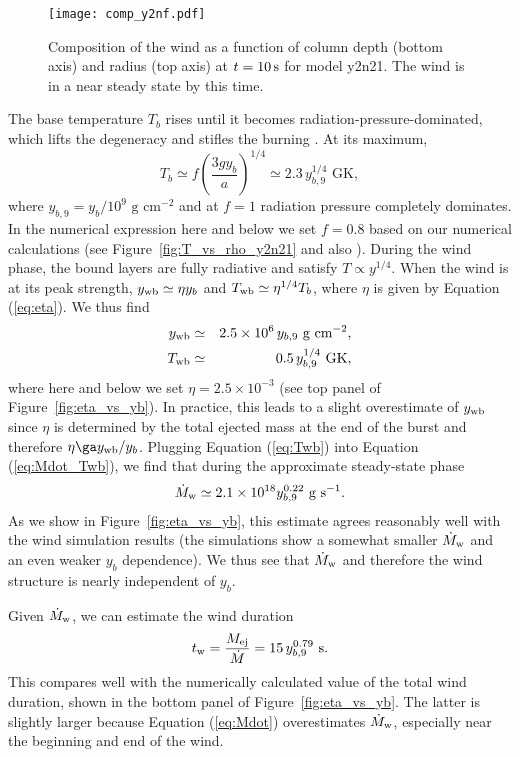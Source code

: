 \documentclass[apj,usenatbib, iop, twocolappendix]{emulateapj}
\newcommand{\Mdot}{\dot{M}_{\rm w}}
\newcommand{\beq}{\begin{equation}}
\newcommand{\eeq}{\end{equation}}
\newcommand{\bea}{\begin{eqnarray}}
\newcommand{\eea}{\end{eqnarray}}
\newcommand{\trm}[1]{\textrm{#1}}
\begin{document}
\begin{figure}
\texttt{[image: comp\_y2nf.pdf]}
\caption{Composition of the wind as a function of column depth (bottom axis) and radius (top axis) at $t=10\,{\rm s}$ for model y2n21. The wind is in a near steady state by this time.}
\label{fig:comp_y2n21}
\end{figure}


The base temperature $T_b$ rises until it becomes radiation-pressure-dominated, which lifts the degeneracy and stifles the burning \citep{Fujimoto:81, Bildsten:98}. At its maximum,
\beq
T_b\simeq f\left(\frac{3 g y_b}{a}\right)^{1/4} \simeq 2.3 \, y_{b,9}^{1/4}\trm{ GK},
\eeq
where $y_{b,9}=y_b/10^9\trm{ g cm}^{-2}$ and at $f=1$ radiation pressure completely dominates.  In the numerical expression here and below we set $f=0.8$ based on our numerical calculations (see Figure~\ref{fig:T_vs_rho_y2n21} and also ).  During the wind phase, the bound layers are fully radiative and satisfy $T\propto y^{1/4}$. When the wind is at its peak strength, $y_{\rm wb} \simeq \eta y_b$ and $T_{\rm wb} \simeq \eta^{1/4}T_b$, where $\eta$ is given by Equation (\ref{eq:eta}).  We thus find
\bea
\label{eq:ywb}
y_{\rm wb} &\simeq& 2.5\times10^6 \,y_{b,9} \trm{ g cm}^{-2},\\
\label{eq:Twb}
T_{\rm wb} &\simeq&  0.5\, y_{b,9}^{1/4}\trm{ GK},
\eea
where here and below we set $\eta=2.5\times10^{-3}$  (see top panel of Figure~\ref{fig:eta_vs_yb}).  In practice, this leads to a slight overestimate of $y_{\rm wb}$ since $\eta$ is determined by the total ejected mass at the end of the burst and therefore $\eta \ga y_{\rm wb}/y_b$.   Plugging Equation (\ref{eq:Twb}) into Equation (\ref{eq:Mdot_Twb}), we find that during the approximate steady-state phase
\beq
\Mdot \simeq 2.1\times10^{18} y_{b,9}^{0.22}\trm{ g s}^{-1}.
\label{eq:Mdot}
\eeq
As we show in Figure~\ref{fig:eta_vs_yb}, this estimate agrees reasonably well with the wind simulation results (the simulations show a somewhat smaller $\Mdot$ and an even weaker $y_b$ dependence).  We thus see that $\Mdot$ and therefore the wind structure is nearly independent of $y_b$.

Given $\Mdot$, we can estimate the wind duration
\beq
t_{\rm w} = \frac{M_{\rm ej}}{\dot{M}}=15\,y_{b,9}^{0.79}\trm{ s}.
\label{eq:tw}
\eeq
This compares well with the numerically calculated value of the total wind duration, shown in the bottom panel of Figure~\ref{fig:eta_vs_yb}. The latter is slightly larger because Equation (\ref{eq:Mdot}) overestimates $\Mdot$, especially near the beginning and end of the wind.
\end{document}
